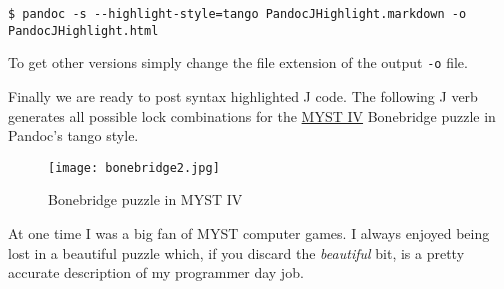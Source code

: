 \documentclass[]{article}
\makeatletter
\def\maxwidth{\ifdim\Gin@nat@width>\linewidth\linewidth
\else\Gin@nat@width\fi}
\let\Oldincludegraphics\includegraphics
\renewcommand{\includegraphics}[1]{\Oldincludegraphics[width=\maxwidth]{#1}}
\makeatother
\begin{document}
\begin{verbatim}
$ pandoc -s --highlight-style=tango PandocJHighlight.markdown -o PandocJHighlight.html
\end{verbatim}

To get other versions simply change the file extension of the output
\texttt{-o} file.

Finally we are ready to post syntax highlighted J code. The following J
verb generates all possible lock combinations for the
\href{http://en.wikipedia.org/wiki/Myst\_IV:\_Revelation}{MYST IV}
Bonebridge puzzle in Pandoc's tango style.

\begin{figure}[htbp]
\centering
\texttt{[image: bonebridge2.jpg]}
\caption{Bonebridge puzzle in MYST IV}
\end{figure}

At one time I was a big fan of MYST computer games. I always enjoyed
being lost in a beautiful puzzle which, if you discard the
\emph{beautiful} bit, is a pretty accurate description of my programmer
day job.
\end{document}
